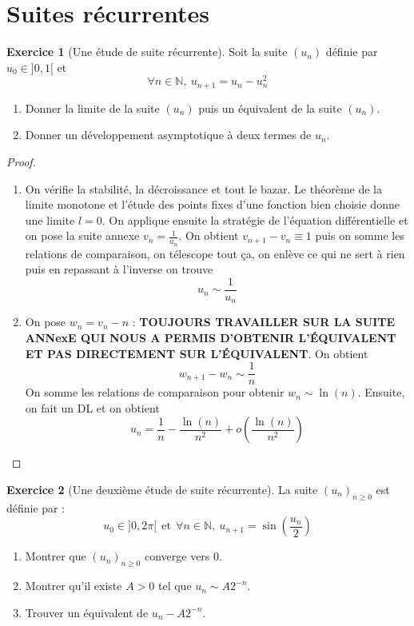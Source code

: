 \documentclass[french]{book}
\newcommand{\N}{\mathbb{N}}
\theoremstyle{definition}
\newtheorem{ex}{Exercice}[chapter]
\theoremstyle{theorem}
\theoremstyle{remark}
\begin{document}
\section{Suites récurrentes}

\begin{ex}[Une étude de suite récurrente]
	Soit la suite $(u_n)$ définie par $u_0\in]0,1[$ et $$\forall n\in\N,\ u_{n+1}=u_n-u_n^2$$
	\begin{enumerate}
		\item Donner la limite de la suite $(u_n)$ puis un équivalent de la suite $(u_n)$.
		\item Donner un développement asymptotique à deux termes de $u_n$.
	\end{enumerate}
\end{ex}

\begin{proof}
	\begin{enumerate}
		\item On vérifie la stabilité, la décroissance et tout le bazar. Le théorème de la limite monotone et l'étude des points fixes d'une fonction bien choisie donne une limite $l=0$. On applique ensuite la stratégie de l'équation différentielle et on pose la suite annexe $v_n=\displaystyle\frac{1}{u_n}$. On obtient $v_{n+1}-v_n\equiv 1$ puis on somme les relations de comparaison, on télescope tout ça, on enlève ce qui ne sert à rien puis en repassant à l'inverse on trouve $$u_n\sim\frac{1}{u_n}$$
		\item On pose $w_n=v_n-n$ : \textbf{TOUJOURS TRAVAILLER SUR LA SUITE ANNexE QUI NOUS A PERMIS D'OBTENIR L'ÉQUIVALENT ET PAS DIRECTEMENT SUR L'ÉQUIVALENT}. On obtient $$w_{n+1}-w_n\sim\frac{1}{n}$$ On somme les relations de comparaison pour obtenir $w_n\sim\ln(n)$. Ensuite, on fait un DL et on obtient $$u_n=\frac{1}{n}-\frac{\ln(n)}{n^2}+o\left(\frac{\ln(n)}{n^2}\right)$$
	\end{enumerate}
\end{proof}

\begin{ex}[Une deuxième étude de suite récurrente]
	La suite $(u_n)_{n\geqslant0}$ est définie par : $$u_0\in]0,2\pi[\ \ \text{et} \ \ \forall n\in\N,\ u_{n+1}=\sin\left(\frac{u_n}{2}\right)$$
	\begin{enumerate}
		\item Montrer que $(u_n)_{n\geqslant0}$ converge vers $0$.
		\item Montrer qu'il existe $A>0$ tel que $u_n\sim A2^{-n}$.
		\item Trouver un équivalent de $u_n-A2^{-n}$.
	\end{enumerate}
\end{ex}
\end{document}
